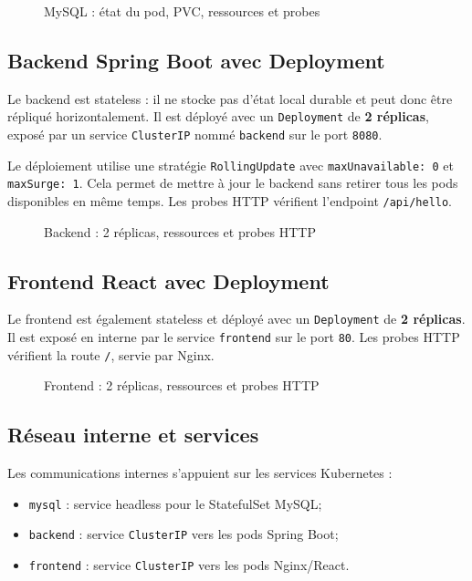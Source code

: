 \documentclass[11pt,a4paper]{article}
\begin{document}
\begin{figure}[H]
    \centering
    
    \caption{MySQL : état du pod, PVC, ressources et probes}
\end{figure}

\subsection{Backend Spring Boot avec Deployment}

Le backend est stateless : il ne stocke pas d'état local durable et peut donc être répliqué horizontalement. Il est déployé avec un \texttt{Deployment} de \textbf{2 réplicas}, exposé par un service \texttt{ClusterIP} nommé \texttt{backend} sur le port \texttt{8080}.

Le déploiement utilise une stratégie \texttt{RollingUpdate} avec \texttt{maxUnavailable: 0} et \texttt{maxSurge: 1}. Cela permet de mettre à jour le backend sans retirer tous les pods disponibles en même temps. Les probes HTTP vérifient l'endpoint \texttt{/api/hello}.

\begin{figure}[H]
    \centering
    
    \caption{Backend : 2 réplicas, ressources et probes HTTP}
\end{figure}

\subsection{Frontend React avec Deployment}

Le frontend est également stateless et déployé avec un \texttt{Deployment} de \textbf{2 réplicas}. Il est exposé en interne par le service \texttt{frontend} sur le port \texttt{80}. Les probes HTTP vérifient la route \texttt{/}, servie par Nginx.

\begin{figure}[H]
    \centering
    
    \caption{Frontend : 2 réplicas, ressources et probes HTTP}
\end{figure}

\subsection{Réseau interne et services}

Les communications internes s'appuient sur les services Kubernetes :
\begin{itemize}
    \item \texttt{mysql} : service headless pour le StatefulSet MySQL;
    \item \texttt{backend} : service \texttt{ClusterIP} vers les pods Spring Boot;
    \item \texttt{frontend} : service \texttt{ClusterIP} vers les pods Nginx/React.
\end{itemize}
\end{document}
